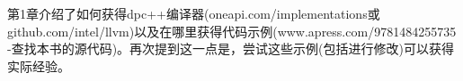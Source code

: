 

第1章介绍了如何获得dpc++编译器(oneapi.com/implementations或github.com/intel/llvm)以及在哪里获得代码示例(www.apress.com/9781484255735 -查找本书的源代码)。再次提到这一点是，尝试这些示例(包括进行修改)可以获得实际经验。\par